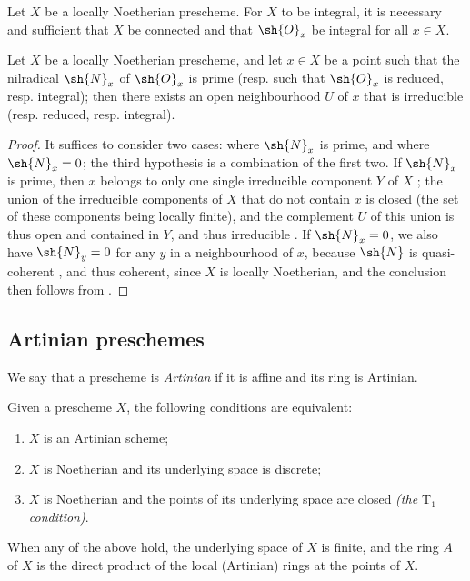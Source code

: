 \begin{corollary}[6.1.12]
\label{I.6.1.12}
Let $X$ be a locally Noetherian prescheme.
For $X$ to be integral, it is necessary and sufficient that $X$ be connected and that $\sh{O}_x$ be integral for all $x\in X$.
\end{corollary}

\begin{proposition}[6.1.13]
\label{I.6.1.13}
Let $X$ be a locally Noetherian prescheme, and let $x\in X$ be a point such that the nilradical $\sh{N}_x$ of $\sh{O}_x$ is prime (resp. such that $\sh{O}_x$ is reduced, resp. integral);
then there exists an open neighbourhood $U$ of $x$ that is irreducible (resp. reduced, resp. integral).
\end{proposition}

\begin{proof}
It suffices to consider two cases: where $\sh{N}_x$ is prime, and where $\sh{N}_x=0$; the third hypothesis is a combination of the first two.
If $\sh{N}_x$ is prime, then $x$ belongs to only one single irreducible component $Y$ of $X$ ;
the union of the irreducible components of $X$ that do not contain $x$ is closed (the set of these components being locally finite), and the complement $U$ of this union is thus open and contained in $Y$, and thus irreducible .
If $\sh{N}_x=0$, we also have $\sh{N}_y=0$ for any $y$ in a neighbourhood of $x$, because $\sh{N}$ is quasi-coherent , and thus coherent, since $X$ is locally Noetherian, and the conclusion then follows from .
\end{proof}

\subsection{Artinian preschemes}
\label{subsection:I.6.2}
\label{I.6.2}

\begin{definition}[6.2.1]
\label{I.6.2.1}
We say that a prescheme is \emph{Artinian} if it is affine and its ring is Artinian.
\end{definition}

\begin{proposition}[6.2.2]
\label{I.6.2.2}
Given
a prescheme $X$, the following conditions are equivalent:
\begin{enumerate}
  \item[{\rm(a)}] $X$ is an Artinian scheme;
  \item[{\rm(b)}] $X$ is Noetherian and its underlying space is discrete;
  \item[{\rm(c)}] $X$ is Noetherian and the points of its underlying space are closed \emph{(the $\mathrm{T}_1$ condition)}.
\end{enumerate}
When any of the above hold, the underlying space of $X$ is finite, and the ring $A$ of $X$ is the direct product of the local (Artinian) rings at the points of $X$.
\end{proposition}

